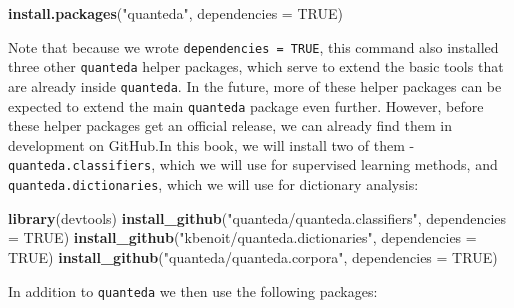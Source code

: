 \documentclass[
]{book}
\newenvironment{Shaded}{\begin{snugshade}}{\end{snugshade}}
\newcommand{\AttributeTok}[1]{\textcolor[rgb]{0.13,0.29,0.53}{#1}}
\newcommand{\ConstantTok}[1]{\textcolor[rgb]{0.56,0.35,0.01}{#1}}
\newcommand{\FunctionTok}[1]{\textcolor[rgb]{0.13,0.29,0.53}{\textbf{#1}}}
\newcommand{\NormalTok}[1]{#1}
\newcommand{\StringTok}[1]{\textcolor[rgb]{0.31,0.60,0.02}{#1}}
\begin{document}
\begin{Shaded}
\begin{Highlighting}[]
\FunctionTok{install.packages}\NormalTok{(}\StringTok{"quanteda"}\NormalTok{, }\AttributeTok{dependencies =} \ConstantTok{TRUE}\NormalTok{)}
\end{Highlighting}
\end{Shaded}

Note that because we wrote \texttt{dependencies\ =\ TRUE}, this command also installed three other \texttt{quanteda} helper packages, which serve to extend the basic tools that are already inside \texttt{quanteda}. In the future, more of these helper packages can be expected to extend the main \texttt{quanteda} package even further. However, before these helper packages get an official release, we can already find them in development on GitHub.In this book, we will install two of them - \texttt{quanteda.classifiers}, which we will use for supervised learning methods, and \texttt{quanteda.dictionaries}, which we will use for dictionary analysis:

\begin{Shaded}
\begin{Highlighting}[]
\FunctionTok{library}\NormalTok{(devtools)}
\FunctionTok{install\_github}\NormalTok{(}\StringTok{"quanteda/quanteda.classifiers"}\NormalTok{, }\AttributeTok{dependencies =} \ConstantTok{TRUE}\NormalTok{)}
\FunctionTok{install\_github}\NormalTok{(}\StringTok{"kbenoit/quanteda.dictionaries"}\NormalTok{, }\AttributeTok{dependencies =} \ConstantTok{TRUE}\NormalTok{)}
\FunctionTok{install\_github}\NormalTok{(}\StringTok{"quanteda/quanteda.corpora"}\NormalTok{, }\AttributeTok{dependencies =} \ConstantTok{TRUE}\NormalTok{)}
\end{Highlighting}
\end{Shaded}

In addition to \texttt{quanteda} we then use the following packages:
\end{document}
